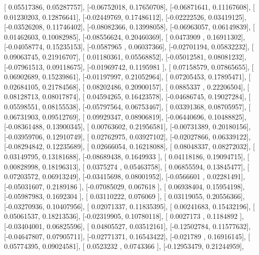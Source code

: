 \documentclass{article}
\begin{document}
       [ 0.05517386,  0.05287757],
       [-0.06752018,  0.17650708],
       [-0.06871641,  0.11167608],
       [ 0.01230203,  0.12876641],
       [-0.02449769,  0.17486112],
       [-0.02222526,  0.03419125],
       [-0.03526208,  0.11746402],
       [-0.08082366,  0.13998058],
       [-0.06963057,  0.06149839],
       [ 0.01462603,  0.10082985],
       [-0.08556624,  0.20460369],
       [ 0.0473909 ,  0.16911302],
       [-0.04058774,  0.15235153],
       [-0.0587965 ,  0.06037366],
       [-0.02701194,  0.05832232],
       [ 0.09063745,  0.21916707],
       [ 0.01180361,  0.05568852],
       [-0.05012581,  0.08081232],
       [-0.07961513,  0.09118675],
       [-0.01969742,  0.1195981 ],
       [ 0.07158579,  0.07865655],
       [ 0.06902689,  0.15239861],
       [-0.01197997,  0.21052964],
       [ 0.07205453,  0.17895471],
       [ 0.02684105,  0.21784568],
       [ 0.08202486,  0.20900157],
       [ 0.0885337 ,  0.22206504],
       [ 0.08128713,  0.08017874],
       [ 0.04594265,  0.16423578],
       [-0.04686745,  0.19027284],
       [ 0.05598551,  0.08155538],
       [-0.05797564,  0.06753467],
       [ 0.03391368,  0.08705957],
       [ 0.06731903,  0.09512769],
       [ 0.09929347,  0.08906819],
       [-0.06440696,  0.10488825],
       [-0.08361488,  0.13900345],
       [ 0.00763602,  0.21956581],
       [-0.00731389,  0.20180156],
       [-0.03959706,  0.12910749],
       [ 0.02762975,  0.03927102],
       [-0.02027866,  0.06339122],
       [-0.08294842,  0.12235689],
       [ 0.02666054,  0.16218088],
       [ 0.08048337,  0.08272032],
       [ 0.03149795,  0.13181688],
       [-0.08689438,  0.1649933 ],
       [ 0.04118186,  0.19094715],
       [ 0.00828998,  0.18196313],
       [ 0.0375274 ,  0.05463758],
       [ 0.06855594,  0.13845477],
       [ 0.07203572,  0.06913249],
       [-0.03415698,  0.08001952],
       [-0.0566601 ,  0.02281491],
       [-0.05031607,  0.2189186 ],
       [-0.07085029,  0.067618  ],
       [ 0.06938404,  0.15954198],
       [-0.05987983,  0.1692304 ],
       [ 0.03110222,  0.076069  ],
       [ 0.03119055,  0.20556366],
       [-0.03270936,  0.10407956],
       [ 0.02071337,  0.11835395],
       [ 0.00241683,  0.15432196],
       [ 0.05061537,  0.18213536],
       [-0.02319905,  0.10780118],
       [ 0.0027173 ,  0.1184892 ],
       [-0.03404001,  0.06825596],
       [ 0.04805527,  0.03512161],
       [-0.12502784,  0.11577632],
       [-0.04647807,  0.07905711],
       [-0.02771371,  0.16543422],
       [-0.021789  ,  0.16916145],
       [ 0.05774395,  0.09024581],
       [ 0.0523232 ,  0.0743366 ],
       [-0.12953479,  0.21244959],
\end{document}

